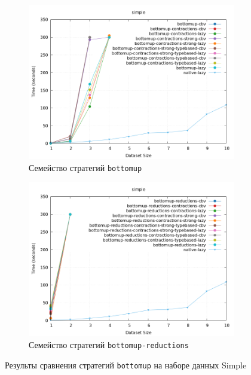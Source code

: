 \documentclass[../thesis.tex]{subfiles}
\begin{document}
\begin{figure}[h]
    \begin{subfigure}{0.5\textwidth}
    \includegraphics[width=\linewidth]{bottomup.png} 
    \caption{Семейство стратегий \texttt{bottomup}}
    \end{subfigure}
    \begin{subfigure}{0.5\textwidth}
    \includegraphics[width=\linewidth]{bottomup_reductions.png}
    \caption{Семейство стратегий \texttt{bottomup-reductions}}
    \end{subfigure}
    \caption{Результы сравнения стратегий \texttt{bottomup} на наборе данных Simple}
    \label{plot_bottomup}
\end{figure}
\end{document}
